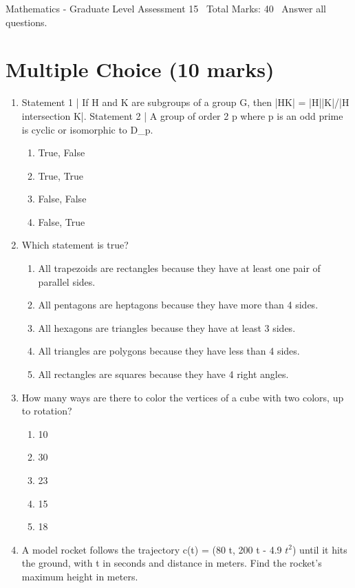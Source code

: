 \documentclass[12pt]{article}
\begin{document}
\begin{center}
Mathematics - Graduate Level Assessment 15 \
Total Marks: 40 \
Answer all questions.
\end{center}

\section*{Multiple Choice (10 marks)}
\begin{enumerate}[label=\arabic*.]
\item Statement 1 | If H and K are subgroups of a group G, then |HK| = |H||K|/|H intersection K|. Statement 2 | A group of order 2 p where p is an odd prime is cyclic or isomorphic to D\_p.
\begin{enumerate}[label=(\alph*)]
    \item True, False
    \item True, True
    \item False, False
    \item False, True
\end{enumerate}
\item Which statement is true?
\begin{enumerate}[label=(\alph*)]
    \item All trapezoids are rectangles because they have at least one pair of parallel sides.
    \item All pentagons are heptagons because they have more than 4 sides.
    \item All hexagons are triangles because they have at least 3 sides.
    \item All triangles are polygons because they have less than 4 sides.
    \item All rectangles are squares because they have 4 right angles.
\end{enumerate}
\item How many ways are there to color the vertices of a cube with two colors, up to rotation?
\begin{enumerate}[label=(\alph*)]
    \item 10
    \item 30
    \item 23
    \item 15
    \item 18
\end{enumerate}
\item A model rocket follows the trajectory c(t) = (80 t, 200 t - 4.9 $t^2$) until it hits the ground, with t in seconds and distance in meters. Find the rocket's maximum height in meters.

\end{enumerate}
\end{document}
